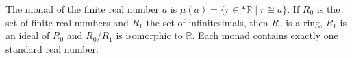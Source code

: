 The monad of the finite real number $a$ is $\mu(a) = \{r \in *\mathbb{R} \mid r \cong a\}$. If $R_0$ is the set of finite real numbers and $R_1$ the set of infinitesimals, then $R_0$ is a ring, $R_1$ is an ideal of $R_0$ and $R_0/R_1$ is isomorphic to $\mathbb{R}$. Each monad contains exactly one standard real number.
